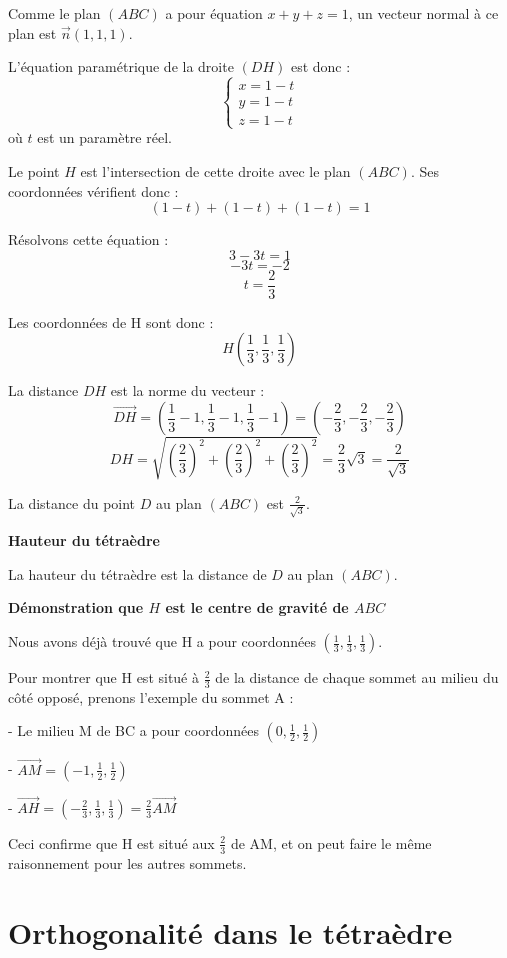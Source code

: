 \documentclass[10pt,a4paper]{article}
\begin{document}
Comme le plan $(ABC)$ a pour équation $x + y + z = 1$, un vecteur normal à ce plan est
$\vec{n}(1,1,1)$.

L'équation paramétrique de la droite $(DH)$ est donc :
   $$ \begin{cases}
   x = 1 - t \\
   y = 1 - t \\
   z = 1 - t
   \end{cases} $$
où $t$ est un paramètre réel.

Le point $H$ est l'intersection de cette droite avec le plan $(ABC)$.
Ses coordonnées vérifient donc :
$$ (1-t) + (1-t) + (1-t) = 1 $$

Résolvons cette équation :
$$ 3 - 3t = 1 $$
$$ -3t = -2 $$
$$ t = \frac{2}{3} $$

Les coordonnées de H sont donc :
$$ H(\frac{1}{3}, \frac{1}{3}, \frac{1}{3}) $$

La distance $DH$ est la norme du vecteur :
$$ \overrightarrow{DH} = (\frac{1}{3} - 1, \frac{1}{3} - 1, \frac{1}{3} - 1) = (-\frac{2}{3}, -\frac{2}{3}, -\frac{2}{3}) $$
$$ DH = \sqrt{(\frac{2}{3})^2 + (\frac{2}{3})^2 + (\frac{2}{3})^2} = \frac{2}{3}\sqrt{3} = \frac{2}{\sqrt{3}} $$

La distance du point $D$ au plan $(ABC)$ est $\frac{2}{\sqrt{3}}$.


\q \textbf{Hauteur du tétraèdre}

La hauteur du tétraèdre est la distance de \(D\) au plan \((ABC)\).


\q \textbf{Démonstration que \(H\) est le centre de gravité de \(ABC\)}

Nous avons déjà trouvé que H a pour coordonnées $(\frac{1}{3}, \frac{1}{3}, \frac{1}{3})$.

Pour montrer que H est situé à $\frac{2}{3}$ de la distance de chaque sommet au milieu du côté
opposé, prenons l'exemple du sommet A :

- Le milieu M de BC a pour coordonnées $(0, \frac{1}{2}, \frac{1}{2})$

- $\overrightarrow{AM} = (-1, \frac{1}{2}, \frac{1}{2})$

- $\overrightarrow{AH} = (-\frac{2}{3}, \frac{1}{3}, \frac{1}{3}) = \frac{2}{3}\overrightarrow{AM}$

Ceci confirme que H est situé aux $\frac{2}{3}$ de AM, et on peut faire le même raisonnement pour
les autres sommets.


\section{Orthogonalité dans le tétraèdre}
\end{document}

